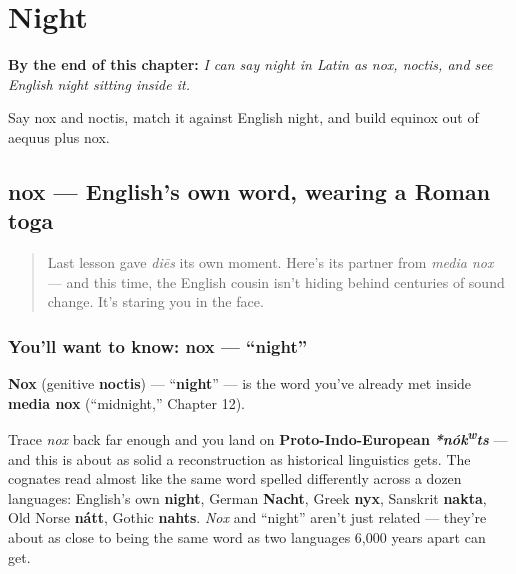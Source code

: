 
\chapter{Night}
\label{ch:la-night}

\begin{chapteropening}
\textbf{By the end of this chapter:} \emph{I can say night in Latin as nox, noctis, and see English night sitting inside it.}

Say nox and noctis, match it against English night, and build equinox out of aequus plus nox.
\end{chapteropening}

\section[nox]{nox — English's own word, wearing a Roman toga}

\label{lesson:LA-C29-nox}



\begin{quote}
Last lesson gave \emph{diēs} its own moment. Here's its partner from \emph{media nox} — and this time, the English cousin isn't hiding behind centuries of sound change. It's staring you in the face.
\end{quote}

\subsection*{You'll want to know: nox — \textquotedblleft{}night\textquotedblright{}}
\textbf{Nox} (genitive \textbf{noctis}) — \textquotedblleft{}\textbf{night}\textquotedblright{} — is the word you've already met inside \textbf{media nox} (\textquotedblleft{}midnight,\textquotedblright{} Chapter 12).

\begin{cousinweb}
Trace \emph{nox} back far enough and you land on \textbf{Proto-Indo-European} \emph{\textbf{*nók\textsuperscript{w}ts}} — and this is about as solid a reconstruction as historical linguistics gets. The cognates read almost like the same word spelled differently across a dozen languages: English's own \textbf{night}, German \textbf{Nacht}, Greek \textbf{nyx}, Sanskrit \textbf{nakta}, Old Norse \textbf{nátt}, Gothic \textbf{nahts}. \emph{Nox} and \textquotedblleft{}night\textquotedblright{} aren't just related — they're about as close to being the same word as two languages 6,000 years apart can get.
\end{cousinweb}

